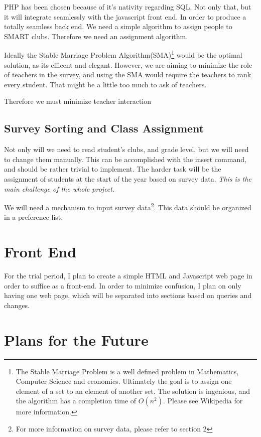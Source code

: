 \documentclass{article}
\begin{document}
PHP has been chosen because of it's nativity regarding SQL. Not only that, but it will integrate seamlessly with the javascript front end. In 
order to produce a totally seamless back end. We need a simple algorithm to assign people to SMART clubs. Therefore we need an assignment algorithm. 

Ideally the Stable Marriage Problem Algorithm(SMA)\footnote{The Stable Marriage Problem is a well defined problem in Mathematics, Computer 
Science 
and economics. Ultimately the goal is to assign one element of a set to an element of another set. The solution is ingenious, and the algorithm 
has a completion time of $O(n^2)$. Please see Wikipedia for more information.} would be the optimal solution, as its efficent and elegant.
However, we are aiming to minimize the role of teachers in the survey, and using the SMA would require the teachers to rank every student. 
That might be a little too much to ask of teachers. 

Therefore we must minimize teacher interaction 

\subsection{Survey Sorting and Class Assignment}
Not only will we need to read student's clubs, and grade level, but we will need to change them manually. This can be accomplished with the 
insert command, and should be rather trivial to implement. The harder task will be the assignment of students at the start of the year based on 
survey data. \emph{This is the main challenge of the whole project.}

We will need a mechanism to input survey data\footnote{For more information on survey data, please refer to section 2}. This data should be 
organized in a preference list. 
\section{Front End}
For the trial period, I plan to create a simple HTML and Javascript web page in order to suffice as a front-end. In order to minimize 
confusion, I plan on only having one web page, which will be separated into sections based on queries and changes. 
\section{Plans for the Future}
\end{document}

